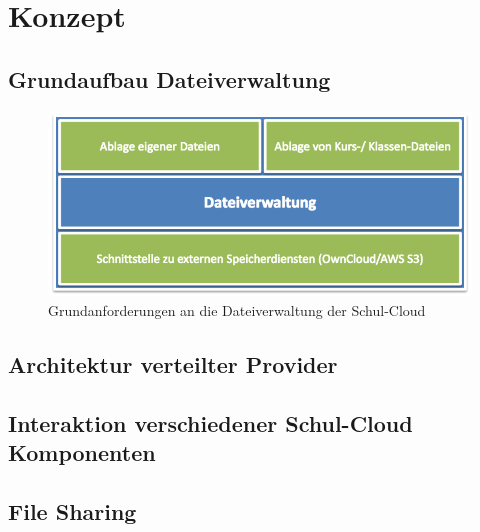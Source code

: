 \section{Konzept}
\label{sec:concept}

\subsection{Grundaufbau Dateiverwaltung}

\begin{center}
	
	\begin{figure}[H]
		\begin{center}
			\includegraphics[width=0.8\linewidth]{images/AnforderungenDateiverwaltung}
			\caption[Caption for relatedWork]{Grundanforderungen an die Dateiverwaltung der Schul-Cloud\footnotemark}
			\label{fig:devices}
		\end{center}
	\end{figure}
\end{center}

\subsection{Architektur verteilter Provider}

\subsection{Interaktion verschiedener Schul-Cloud Komponenten}

\subsection{File Sharing}

\clearpage
